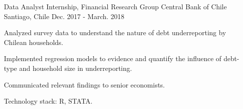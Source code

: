 \begin{cventries}


  \cventry
    {Data Analyst Internship, Financial Research Group} %
    {Central Bank of Chile} %
    {Santiago, Chile} %
    {Dec. 2017 - March. 2018} %
    {
      \begin{cvitems} %
        \item {Analyzed survey data to understand the nature of debt underreporting by Chilean households.}
        \item {Implemented regression models to evidence and quantify the influence of debt-type and household size in underreporting.}
        \item {Communicated relevant findings to senior economists.}
        \item {Technology stack: R, STATA.}
      \end{cvitems}
    }
\end{cventries}
